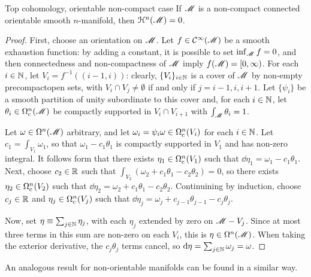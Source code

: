 \begin{proposition}{Top cohomology, orientable non-compact case}{}
  If $ \mathscr{M} $ is a non-compact connected orientable smooth $ n $-manifold, then $ \EuScript{H}^{n}(\mathscr{M}) = 0 $.
\end{proposition}

\begin{proofbox}
  \begin{proof}
    First, choose an orientation on $ \mathscr{M} $. Let $ f \in \mathcal{C}^{\infty}(\mathscr{M}) $ be a smooth exhaustion function: by adding a constant, it is possible to set $ \inf_\mathscr{M} f = 0 $, and then connectedness and non-compactness of $ \mathscr{M} $ imply $ f(\mathscr{M}) = [0 , \infty) $. For each $ i \in \mathbb{N} $, let $ V_i = f^{-1}((i - 1 , i)) $: clearly, $ \{V_i\}_{i \in \mathbb{N}} $ is a cover of $ \mathscr{M} $ by non-empty precompact\footnotemark open sets, with $ V_i \cap V_j \neq \emptyset $ if and only if $ j = i-1,i,i+1 $. Let $ \{\psi_i\} $ be a smooth partition of unity subordinate to this cover and, for each $ i \in \mathbb{N} $, let $ \theta_i \in \Omega_\text{c}^{n}(\mathscr{M}) $ be compactly supported in $ V_i \cap V_{i+1} $ with $ \int_\mathscr{M} \theta_i = 1 $.

    Let $ \omega \in \Omega^{n}(\mathscr{M}) $ arbitrary, and let $ \omega_i = \psi_i \omega \in \Omega_\text{c}^{n}(V_i) $ for each $ i \in \mathbb{N} $. Let $ c_1 = \int_{V_1} \omega_1 $, so that $ \omega_1 - c_1 \theta_1 $ is compactly supported in $ V_1 $ and has non-zero integral. It follows form  that there exists $ \eta_1 \in \Omega_\text{c}^{n}(V_1) $ such that $ \dd \eta_1 = \omega_1 - c_1 \theta_1 $. Next, choose $ c_2 \in \mathbb{R} $ such that $ \int_{V_2} (\omega_2 + c_1 \theta_1 - c_2 \theta_2) = 0 $, so there exists $ \eta_2 \in \Omega_\text{c}^{n}(V_2) $ such that $ \dd \eta_2 = \omega_2 + c_1 \theta_1 - c_2 \theta_2 $. Continuining by induction, choose $ c_j \in \mathbb{R} $ and $ \eta_j \in \Omega_\text{c}^{n}(V_j) $ such that $ \dd \eta_j = \omega_j + c_{j-1} \theta_{j-1} - c_j \theta_j $.

    Now, set $ \eta \equiv \sum_{j \in \mathbb{N}} \eta_j $, with each $ \eta_j $ extended by zero on $ \mathscr{M} - V_j $. Since at most three terms in this sum are non-zero on each $ V_i $, this is $ \eta \in \Omega^{n}(\mathscr{M}) $. When taking the exterior derivative, the $ c_j \theta_j $ terms cancel, so $ \mathrm{d} \eta = \sum_{j \in \mathbb{N}} \omega_j = \omega $.
  \end{proof}
\end{proofbox}


An analogous result for non-orientable manifolds can be found in a similar way.

